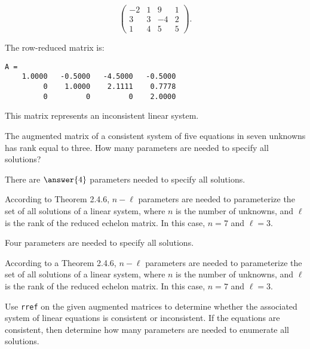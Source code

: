 \documentclass{ximera}
\begin{document}
\begin{computerExercise} \label{c2.3.1c}
\[
\left(\begin{array}{rrrr}
 -2 & 1 &  9 & 1\\
  3 & 3 & -4 & 2\\
  1 & 4 &  5 & 5
\end{array}\right).
\]

\begin{solution}
The row-reduced matrix is:
\begin{verbatim}
A =
    1.0000   -0.5000   -4.5000   -0.5000
         0    1.0000    2.1111    0.7778
         0         0         0    2.0000
\end{verbatim}
This matrix represents an inconsistent linear system.


\end{solution}
\end{computerExercise}

\problemlabel

\begin{exercise} \label{c2.4.2}
The augmented matrix of a consistent system of five equations in seven
unknowns has rank equal to three.  How many parameters are needed to
specify all solutions?
\begin{prompt}
  There are $\answer{4}$ parameters needed to specify all solutions.
\end{prompt}
\begin{hint}
  According to Theorem 2.4.6, $n - \ell$
parameters are needed to parameterize the set of all solutions of a
linear system, where $n$ is the number of unknowns, and $\ell$ is the
rank of the reduced echelon matrix.  In this case, $n = 7$ and $\ell =
3$.
\end{hint}

\begin{solution}

\ans Four parameters are needed to specify all solutions.

\soln According to a Theorem 2.4.6, $n - \ell$
parameters are needed to parameterize the set of all solutions of a
linear system, where $n$ is the number of unknowns, and $\ell$ is the
rank of the reduced echelon matrix.  In this case, $n = 7$ and $\ell = 3$.

\end{solution}
\end{exercise}

\matlabproblemlabel

\noindent Use {\tt rref} on the given augmented matrices to determine whether the associated system of linear equations is consistent or inconsistent.  If the equations are consistent, then determine how many parameters are needed to enumerate all solutions.
\end{document}
